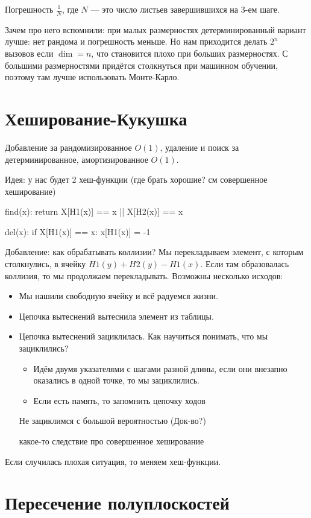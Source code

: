 Погрешность $\frac{1}{N}$, где $N$ --- это число листьев завершившихся на 3-ем шаге.

Зачем про него вспомнили: при малых размерностях детерминированный вариант лучше: нет рандома
и погрешность меньше. Но нам приходится делать $2^n$ вызовов если $\dim = n$, что становится
плохо при больших размерностях. С большими размерностями придётся столкнуться при машинном
обучении, поэтому там лучше использовать Монте-Карло.

\section{Хеширование-Кукушка}

Добавление за рандомизированное $O(1)$, удаление и поиск за детерминированное, амортизированное $O(1)$.

Идея: у нас будет 2 хеш-функции (где брать хорошие? см совершенное хеширование)

\begin{cppcode}
    find(x):
        return X[H1(x)] == x || X[H2(x)] == x
\end{cppcode}

\begin{cppcode}
    del(x):
        if X[H1(x)] == x:
            x[H1(x)] = -1
\end{cppcode}

Добавление: как обрабатывать коллизии? Мы перекладываем элемент, с которым столкнулись, в ячейку $H1(y) + H2(y) - H1(x)$.
Если там образовалась коллизия, то мы продолжаем перекладывать. Возможны несколько исходов:
\begin{itemize}
    \item Мы нашили свободную ячейку и всё радуемся жизни.
    \item Цепочка вытеснений вытеснила элемент из таблицы.
    \item Цепочка вытеснений зациклилась. Как научиться понимать, что мы зациклились?
        \begin{itemize}
            \item Идём двумя указателями с шагами разной длины, если они внезапно оказались в одной точке, то мы зациклились.
            \item Если есть память, то запомнить цепочку ходов
        \end{itemize}
        Не зациклимся с большой вероятностью (Док-во?)
        
        какое-то следствие про совершенное хеширование
\end{itemize}

Если случилась плохая ситуация, то меняем хеш-функции.


\section{Пересечение полуплоскостей}



















